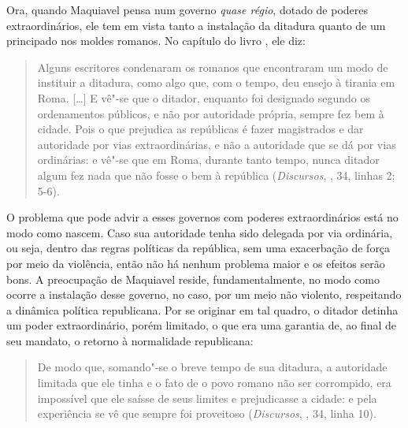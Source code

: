 Ora, quando Maquiavel pensa num governo \emph{quase régio}, dotado de
poderes extraordinários, ele tem em vista tanto a instalação da ditadura
quanto de um principado nos moldes romanos. No capítulo  do livro
, ele diz:

\begin{quote}
Alguns escritores condenaram os romanos que encontraram um modo de
instituir a ditadura, como algo que, com o tempo, deu ensejo à tirania
em Roma. {[}\ldots{}{]} E vê"-se que o ditador, enquanto foi designado segundo
os ordenamentos públicos, e não por autoridade própria, sempre fez bem à
cidade. Pois o que prejudica as repúblicas é fazer magistrados e dar
autoridade por vias extraordinárias, e não a autoridade que se dá por
vias ordinárias: e vê"-se que em Roma, durante tanto tempo, nunca ditador
algum fez nada que não fosse o bem à república (\emph{Discursos}, ,
34, linhas 2; 5-6).
\end{quote}

O problema que pode advir a esses governos com poderes extraordinários
está no modo como nascem. Caso sua autoridade tenha sido delegada por
via ordinária, ou seja, dentro das regras políticas da república, sem
uma exacerbação de força por meio da violência, então não há nenhum
problema maior e os efeitos serão bons. A preocupação de Maquiavel
reside, fundamentalmente, no modo como ocorre a instalação desse
governo, no caso, por um meio não violento, respeitando a dinâmica
política republicana. Por se originar em tal quadro, o ditador detinha
um poder extraordinário, porém limitado, o que era uma garantia de, ao
final de seu mandato, o retorno à normalidade republicana:

\begin{quote}
De modo que, somando"-se o breve tempo de sua ditadura, a autoridade
limitada que ele tinha e o fato de o povo romano não ser corrompido, era
impossível que ele saísse de seus limites e prejudicasse a cidade: e
pela experiência se vê que sempre foi proveitoso (\emph{Discursos}, ,
34, linha 10).
\end{quote}

